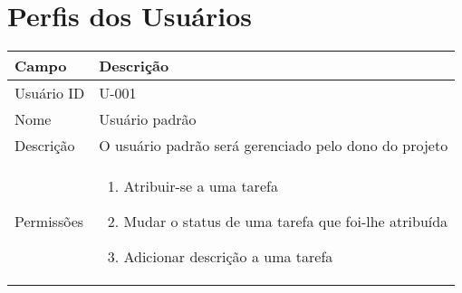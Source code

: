\section{Perfis dos Usuários}

\begin{tabularx}{\textwidth}{| l | X |}
\hline
Campo             & Descrição                                                                                                                                                                           \\ \hline
Usuário ID    & U-001                                                                                                                                                                              \\ \hline
Nome              & Usuário padrão                                                                                                                                                                       \\ \hline
Descrição         & O usuário padrão será gerenciado pelo dono do projeto
\\ \hline
Permissões &
\begin{enumerate}
    \item Atribuir-se a uma tarefa
    \item Mudar o status de uma tarefa que foi-lhe atribuída
    \item Adicionar descrição a uma tarefa 
\end{enumerate}
\\ \hline
\end{tabularx}

\vspace{1cm}

